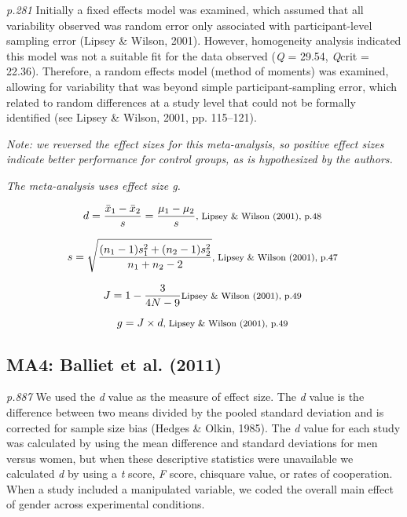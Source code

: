 \documentclass{article}
\begin{document}
\textit{p.281} Initially a fixed effects model was examined, which assumed that all variability observed was random error only associated with participant-level sampling error (Lipsey \& Wilson, 2001). However, homogeneity analysis indicated this model was not a suitable fit for the data observed (\textit{Q} = 29.54, \textit{Q}crit = 22.36). Therefore, a random effects model (method of moments) was examined, allowing for variability that was beyond simple participant-sampling error, which related to random differences at a study level that could not be formally identified (see Lipsey \& Wilson, 2001, pp. 115–121).

\vspace{3 mm}
\textit{Note: we reversed the effect sizes for this meta-analysis, so positive effect sizes indicate better performance for control groups, as is hypothesized by the authors.}

\vspace{3mm}
\textit{The meta-analysis uses effect size g.}

\begin{equation*}
d={\frac {{\bar {x}}_{1}-{\bar {x}}_{2}}{s}}={\frac {\mu_{1}-\mu_{2}}{s}}  \mbox {\footnotesize, Lipsey \& Wilson (2001), p.48 } 
\end{equation*}

\begin{equation*}
s={\sqrt {\frac {(n_{1}-1)s_{1}^{2}+(n_{2}-1)s_{2}^{2}}{n_{1}+n_{2}-2}}} \mbox{\footnotesize,  Lipsey \& Wilson (2001), p.47 } 
\end{equation*}

\begin{equation*}
J={1-{\frac {3}{4N-9}}} \mbox{\footnotesize Lipsey \& Wilson (2001), p.49 }
\end{equation*} 

\begin{equation*}
g=J \times d \mbox{\footnotesize,  Lipsey \& Wilson (2001), p.49 } 
\end{equation*}

\subsection*{MA4: Balliet et al. (2011)}

\textit{p.887} We used the \textit{d} value as the measure of effect size. The \textit{d} value is the difference between two means divided by the pooled standard deviation and is corrected for sample size bias (Hedges \& Olkin, 1985). The \textit{d} value for each study was calculated by using the mean difference and standard deviations for men versus women, but when these descriptive statistics were unavailable we calculated \textit{d} by using a \textit{t} score, \textit{F} score, chisquare value, or rates of cooperation. When a study included a manipulated variable, we coded the overall main effect of gender across experimental conditions. 
\end{document}
